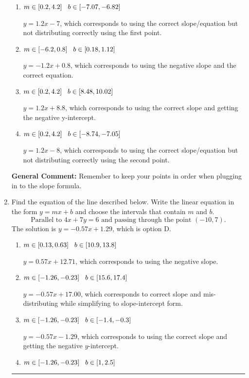 \documentclass{extbook}[14pt]
\newcommand{\litem}[1]{\item #1

\rule{\textwidth}{0.4pt}}
\begin{document}
\begin{enumerate}
{\begin{enumerate}[label=\Alph*.]
* $y = 1.2x -8.8$, which is the correct option.
\item \( m \in [0.2, 4.2] \hspace*{3mm} b \in [-7.07, -6.82] \)

 $y = 1.2x -7$, which corresponds to using the correct slope/equation but not distributing correctly using the first point.
\item \( m \in [-6.2, 0.8] \hspace*{3mm} b \in [0.18, 1.12] \)

 $y = -1.2x + 0.8$, which corresponds to using the negative slope and the correct equation.
\item \( m \in [0.2, 4.2] \hspace*{3mm} b \in [8.48, 10.02] \)

 $y = 1.2x + 8.8$, which corresponds to using the correct slope and getting the negative y-intercept.
\item \( m \in [0.2, 4.2] \hspace*{3mm} b \in [-8.74, -7.05] \)

 $y = 1.2x -8$, which corresponds to using the correct slope/equation but not distributing correctly using the second point.
\end{enumerate}

\textbf{General Comment:} Remember to keep your points in order when plugging in to the slope formula.
}
\litem{
Find the equation of the line described below. Write the linear equation in the form $ y=mx+b $ and choose the intervals that contain $m$ and $b$.
\[ \text{Parallel to } 4 x + 7 y = 6 \text{ and passing through the point } (-10, 7). \]The solution is \( y = -0.57x + 1.29 \), which is option D.\begin{enumerate}[label=\Alph*.]
\item \( m \in [0.13, 0.63] \hspace*{3mm} b \in [10.9, 13.8] \)

 $y = 0.57x + 12.71$, which corresponds to using the negative slope.
\item \( m \in [-1.26, -0.23] \hspace*{3mm} b \in [15.6, 17.4] \)

 $y = -0.57x + 17.00$, which corresponds to correct slope and mis-distributing while simplifying to slope-intercept form.
\item \( m \in [-1.26, -0.23] \hspace*{3mm} b \in [-1.4, -0.3] \)

 $y = -0.57x - 1.29$, which corresponds to using the correct slope and getting the negative $y$-intercept.
\item \( m \in [-1.26, -0.23] \hspace*{3mm} b \in [1, 2.5] \)


\end{enumerate}}
\end{enumerate}
\end{document}
